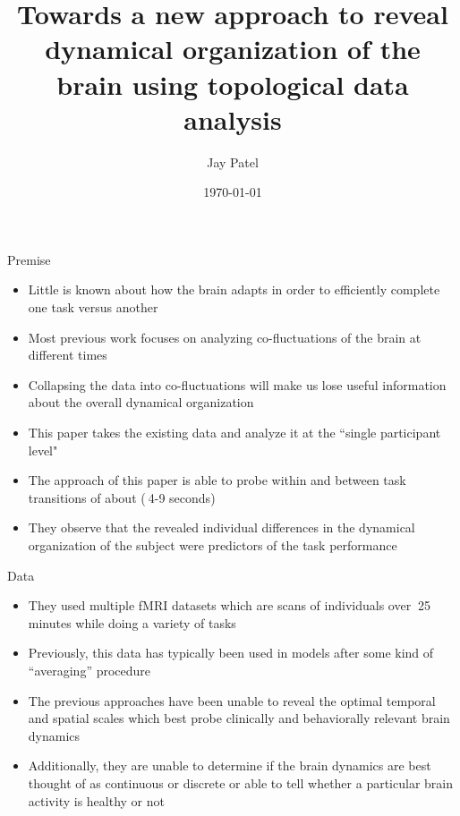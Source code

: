 \documentclass{beamer}
\title[Dynamical organization of brain using TDA]{Towards a new approach to reveal dynamical
organization of the brain using topological data analysis} %
\author{Jay Patel} %
\institute[OSU] %
{
The Ohio State University \\ %
\medskip
\textit{patel.3316@osu.edu} %
}
\date{\today} %
\begin{document}
\begin{frame}
    \nocite{mainpaper}
    \titlepage %
\end{frame}

\begin{frame}{Premise}
    \begin{itemize}
        \item Little is known about how the brain adapts in order to efficiently complete one task versus another \pause
        \item Most previous work focuses on analyzing co-fluctuations of the brain at different times \cite{oldDataCollapsed}\pause
        \item Collapsing the data into co-fluctuations will make us lose useful information about the overall dynamical organization \pause
        \item This paper takes the existing data and analyze it at the ``single participant level" \pause
        \item The approach of this paper is able to probe within and between task transitions of about ($~$4-9 seconds) \pause
        \item They observe that the revealed individual differences in the dynamical organization of the subject were predictors of the task performance
    \end{itemize}
\end{frame}

\begin{frame}{Data}
    \begin{itemize}
        \item They used multiple fMRI datasets which are scans of individuals over $~$25  minutes while doing a variety of tasks \pause
        \item Previously, this data has typically been used in models after some kind of ``averaging'' procedure \pause
        \item The previous approaches have been unable to reveal the optimal temporal and spatial scales which best probe clinically and behaviorally relevant brain dynamics \pause
        \item Additionally, they are unable to determine if the brain dynamics are best thought of as continuous or discrete or able to tell whether a particular brain activity is healthy or not
    \end{itemize}
\end{frame}
\end{document}
